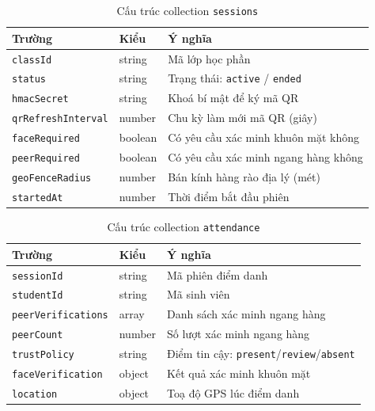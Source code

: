 \documentclass[../main.tex]{subfiles}
\begin{document}
\begin{table}[H]
\centering
\small
\caption{Cấu trúc collection \texttt{sessions}}
\label{tab:session}
\begin{tabular}{|l|l|p{7.5cm}|}
\hline
\textbf{Trường} & \textbf{Kiểu} & \textbf{Ý nghĩa} \\
\hline
\texttt{classId} & string & Mã lớp học phần \\ \hline
\texttt{status} & string & Trạng thái: \texttt{active} / \texttt{ended} \\ \hline
\texttt{hmacSecret} & string & Khoá bí mật để ký mã QR \\ \hline
\texttt{qrRefreshInterval} & number & Chu kỳ làm mới mã QR (giây) \\ \hline
\texttt{faceRequired} & boolean & Có yêu cầu xác minh khuôn mặt không \\ \hline
\texttt{peerRequired} & boolean & Có yêu cầu xác minh ngang hàng không \\ \hline
\texttt{geoFenceRadius} & number & Bán kính hàng rào địa lý (mét) \\ \hline
\texttt{startedAt} & number & Thời điểm bắt đầu phiên \\ \hline
\end{tabular}
\end{table}

\begin{table}[H]
\centering
\small
\caption{Cấu trúc collection \texttt{attendance}}
\label{tab:attendance}
\begin{tabular}{|l|l|p{7.2cm}|}
\hline
\textbf{Trường} & \textbf{Kiểu} & \textbf{Ý nghĩa} \\
\hline
\texttt{sessionId} & string & Mã phiên điểm danh \\ \hline
\texttt{studentId} & string & Mã sinh viên \\ \hline
\texttt{peerVerifications} & array & Danh sách xác minh ngang hàng \\ \hline
\texttt{peerCount} & number & Số lượt xác minh ngang hàng \\ \hline
\texttt{trustPolicy} & string & Điểm tin cậy: \texttt{present}/\texttt{review}/\texttt{absent} \\ \hline
\texttt{faceVerification} & object & Kết quả xác minh khuôn mặt \\ \hline
\texttt{location} & object & Toạ độ GPS lúc điểm danh \\ \hline
\end{tabular}
\end{table}
\end{document}

